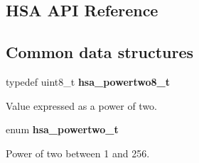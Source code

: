 \documentclass[final]{book}
\begin{document}
\begin{appendices}

\chapter{HSA API Reference}

\section{Common data structures}
\makeatletter{}

\noindent\begin{tcolorbox}[nobeforeafter,arc=0mm,colframe=white,colback=lightgray,left=0mm]
typedef uint8_t  \hypertarget{group--RuntimeCommon-1ga143c7c845aca213614c1d79b65c35a0c}{\textbf{hsa_powertwo8_t}}
\end{tcolorbox}
Value expressed as a power of two.
\\

\noindent\begin{tcolorbox}[nobeforeafter,arc=0mm,colframe=white,colback=lightgray,left=0mm]
enum \hypertarget{group--RuntimeCommon-1ga45e8c4edc00ad0dc2c9e6e14e8610977}{\textbf{hsa_powertwo_t}}
\end{tcolorbox}
Power of two between 1 and 256.


\end{appendices}
\end{document}
